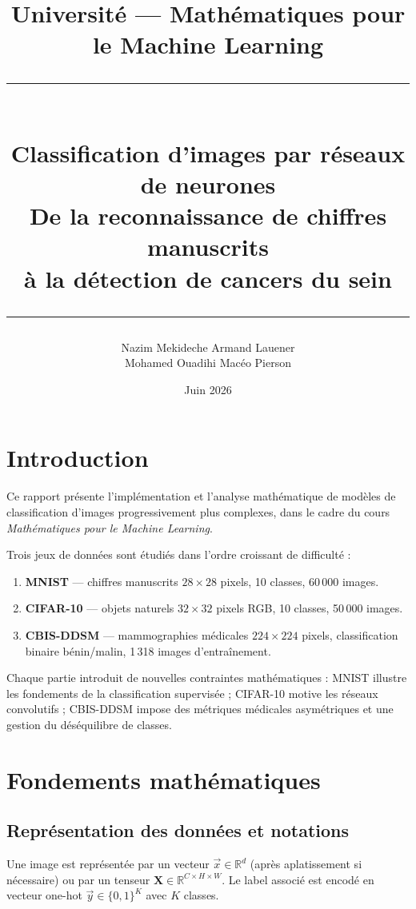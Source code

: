 \documentclass[a4paper,11pt]{article}
\title{
  \vspace{-1cm}
  {\small Université — Mathématiques pour le Machine Learning}\\[0.4cm]
  \rule{\linewidth}{0.5pt}\\[0.4cm]
  {\LARGE\bfseries Classification d'images par réseaux de neurones}\\[0.2cm]
  {\large De la reconnaissance de chiffres manuscrits\\
          à la détection de cancers du sein}\\[0.3cm]
  \rule{\linewidth}{0.5pt}
}
\author{
  Nazim Mekideche \quad Armand Lauener \\
  Mohamed Ouadihi \quad Macéo Pierson
}
\date{Juin 2026}
\begin{document}
\maketitle
\tableofcontents
\newpage

\section{Introduction}

Ce rapport présente l'implémentation et l'analyse mathématique de modèles
de classification d'images progressivement plus complexes, dans le cadre du cours
\textit{Mathématiques pour le Machine Learning}.

Trois jeux de données sont étudiés dans l'ordre croissant de difficulté :
\begin{enumerate}[leftmargin=*]
  \item \textbf{MNIST} — chiffres manuscrits $28\times28$ pixels, 10 classes, 60\,000 images.
  \item \textbf{CIFAR-10} — objets naturels $32\times32$ pixels RGB, 10 classes, 50\,000 images.
  \item \textbf{CBIS-DDSM} — mammographies médicales $224\times224$ pixels, classification
        binaire bénin/malin, 1\,318 images d'entraînement.
\end{enumerate}

Chaque partie introduit de nouvelles contraintes mathématiques :
MNIST illustre les fondements de la classification supervisée ;
CIFAR-10 motive les réseaux convolutifs ;
CBIS-DDSM impose des métriques médicales asymétriques et une gestion du déséquilibre de classes.

\section{Fondements mathématiques}

\subsection{Représentation des données et notations}

Une image est représentée par un vecteur $\vec{x} \in \mathbb{R}^d$
(après aplatissement si nécessaire) ou par un tenseur $\mathbf{X} \in \mathbb{R}^{C \times H \times W}$.
Le label associé est encodé en vecteur one-hot $\vec{y} \in \{0,1\}^K$ avec $K$ classes.
\end{document}
